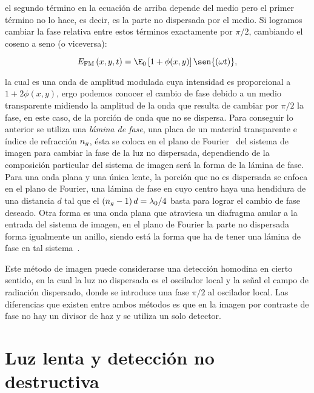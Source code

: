 el segundo término en la ecuación de arriba depende del medio pero el primer término no lo hace, es decir, es la parte no dispersada por el medio. Si logramos cambiar la fase relativa entre estos términos exactamente por $\pi/2$, cambiando el coseno a seno (o viceversa):

\begin{equation}
\label{ec:ondaFaseAmplitud}
E_\sm{\mathrm{FM}}\left(x,y,t\right)=\E_\sm{0}\left[1+\phi(x,y)\right]\sen{\left(\omega t\right)},	
\end{equation}

la cual es una onda de amplitud modulada cuya intensidad es proporcional a $1+2\phi(x,y)$, ergo podemos conocer el cambio de fase debido a un medio transparente midiendo la amplitud de la onda que resulta de cambiar por $\pi/2$ la fase, en este caso, de la porción de onda que no se dispersa. Para conseguir lo anterior se utiliza una \emph{lámina de fase}, una placa de un material transparente e índice de refracción $n_{g}$, ésta se coloca en el plano de Fourier~\cite{hecht} del sistema de imagen para cambiar la fase de la luz no dispersada, dependiendo de la composición particular del sistema de imagen será la forma de la lámina de fase. Para una onda plana y una única lente, la porción que no es dispersada se enfoca en el plano de Fourier, una lámina de fase en cuyo centro haya una hendidura de una distancia $d$ tal que el $\left(n_{g}-1\right)d=\lambda_{0}/4$ basta para lograr el cambio de fase deseado. Otra forma es una onda plana que atraviesa un diafragma anular a la entrada del sistema de imagen, en el plano de Fourier la parte no dispersada forma igualmente un anillo, siendo está la forma que ha de tener una lámina de fase en tal sistema~\cite{hecht}.

\p Este método de imagen puede considerarse una detección homodina en cierto sentido, en la cual la luz no dispersada es el oscilador local y la señal el campo de radiación dispersado, donde se introduce una fase $\pi/2$ al oscilador local. Las diferencias que existen entre ambos métodos es que en la imagen por contraste de fase no hay un divisor de haz y se utiliza un solo detector.

\section{\label{sec:luzLentaDeteccionNoDestructiva}Luz lenta y detección no destructiva}

